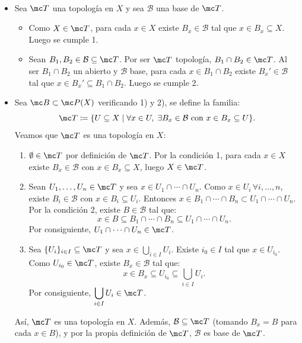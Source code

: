 \begin{dem} \, 
\begin{itemize}
    \item[(\(\Rightarrow\))] Sea \(\mc T\) una topología en \(X\) y sea \(\mathcal{B}\) una base de \(\mc T\).
    \begin{itemize}
        \item Como \(X \in \mc T\), para cada \(x \in X\) existe \(B_x \in \mathcal{B}\) tal que \(x \in B_x \subseteq X\). Luego se cumple 1.
        \item Sean \(B_1, B_2 \in \mathcal{B} \subseteq \mc T\). Por ser \(\mc T\) topología, \(B_1 \cap B_2 \in \mc T\). Al ser \(B_1 \cap B_2\) un abierto y \(\mathcal{B}\) base, para cada \(x \in B_1 \cap B_2\) existe \(B_x' \in \mathcal{B}\) tal que \(x \in B_x' \subseteq B_1 \cap B_2\). Luego se cumple 2.
    \end{itemize}
    \item[(\(\Leftarrow\))] Sea $\mc B \subset \mc P(X)$ verificando 1) y 2), se define la familia:
    \[
        \mc T \coloneqq \{U \subseteq X \mid \forall x \in U, \; \exists B_x \in \mathcal{B} \text{ con } x \in B_x \subseteq U\} \text{}.
    \]
    Veamos que \(\mc T\) es una topología en \(X\):
    \begin{enumerate}
        \item[\textbf{a)}] \(\emptyset \in \mc T\) por definición de $\mc T$. Por la condición 1, para cada \(x \in X\) existe \(B_x \in \mathcal{B}\) con \(x \in B_x \subseteq X\), luego \(X \in \mc T\).
        \item[\textbf{b)}] Sean \(U_1, \ldots, U_n \in \mc T\) y sea \(x \in U_1 \cap \cdots \cap U_n\). Como \(x \in U_i\, \forall i, \ldots, n\), existe \(B_i \in \mathcal{B}\) con \(x \in B_i \subseteq U_i\). Entonces \(x \in B_1 \cap \cdots \cap B_n \subset U_1 \cap \cdots \cap U_n\). Por la condición 2, existe \(B \in \mathcal{B}\) tal que:
        \[
            x \in B \subseteq B_1 \cap \cdots \cap B_n \subseteq U_1 \cap \cdots \cap U_n \text{}.
        \]
        Por consiguiente, \( U_1 \cap \cdots \cap U_n \in \mc T\).
        \item[\textbf{c)}] Sea \(\{U_i\}_{i \in I} \subseteq \mc T\) y sea \(x \in \bigcup_{i \in I} U_i\). Existe \(i_0 \in I\) tal que \(x \in U_{i_0}\). Como \(U_{i_0} \in \mc T\), existe \(B_x \in \mathcal{B}\) tal que:
        \[
            x \in B_x \subseteq U_{i_0} \subseteq \bigcup_{i \in I} U_i \text{}.
        \]
        Por consiguiente, \( \displaystyle \bigcup_{i \in I} U_i \in \mc T\).
    \end{enumerate}
    Así, \(\mc T\) es una topología en \(X\). Además, \(\mathcal{B} \subseteq \mc T\) (tomando \(B_x = B\) para cada \(x \in B\)), y por la propia definición de \(\mc T\), \(\mathcal{B}\) es base de \(\mc T\).
    

\end{itemize}
\end{dem}
